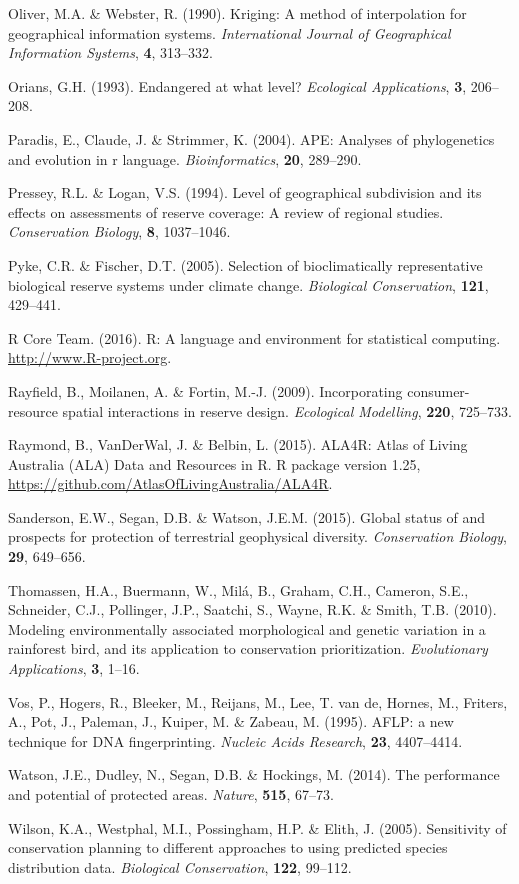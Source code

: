 \hypertarget{ref-r467}{}
Oliver, M.A. \& Webster, R. (1990). Kriging: A method of interpolation
for geographical information systems. \emph{International Journal of
Geographical Information Systems}, \textbf{4}, 313--332.

\hypertarget{ref-r489}{}
Orians, G.H. (1993). Endangered at what level? \emph{Ecological
Applications}, \textbf{3}, 206--208.

\hypertarget{ref-r464}{}
Paradis, E., Claude, J. \& Strimmer, K. (2004). APE: Analyses of
phylogenetics and evolution in r language. \emph{Bioinformatics},
\textbf{20}, 289--290.

\hypertarget{ref-r490}{}
Pressey, R.L. \& Logan, V.S. (1994). Level of geographical subdivision
and its effects on assessments of reserve coverage: A review of regional
studies. \emph{Conservation Biology}, \textbf{8}, 1037--1046.

\hypertarget{ref-r247}{}
Pyke, C.R. \& Fischer, D.T. (2005). Selection of bioclimatically
representative biological reserve systems under climate change.
\emph{Biological Conservation}, \textbf{121}, 429--441.

\hypertarget{ref-r192}{}
R Core Team. (2016). R: A language and environment for statistical
computing. \url{http://www.R-project.org}.

\hypertarget{ref-r471}{}
Rayfield, B., Moilanen, A. \& Fortin, M.-J. (2009). Incorporating
consumer-resource spatial interactions in reserve design.
\emph{Ecological Modelling}, \textbf{220}, 725--733.

\hypertarget{ref-r453}{}
Raymond, B., VanDerWal, J. \& Belbin, L. (2015). ALA4R: Atlas of Living
Australia (ALA) Data and Resources in R. R package version 1.25,
\url{https://github.com/AtlasOfLivingAustralia/ALA4R}.

\hypertarget{ref-r440}{}
Sanderson, E.W., Segan, D.B. \& Watson, J.E.M. (2015). Global status of
and prospects for protection of terrestrial geophysical diversity.
\emph{Conservation Biology}, \textbf{29}, 649--656.

\hypertarget{ref-r468}{}
Thomassen, H.A., Buermann, W., Milá, B., Graham, C.H., Cameron, S.E.,
Schneider, C.J., Pollinger, J.P., Saatchi, S., Wayne, R.K. \& Smith,
T.B. (2010). Modeling environmentally associated morphological and
genetic variation in a rainforest bird, and its application to
conservation prioritization. \emph{Evolutionary Applications},
\textbf{3}, 1--16.

\hypertarget{ref-r472}{}
Vos, P., Hogers, R., Bleeker, M., Reijans, M., Lee, T. van de, Hornes,
M., Friters, A., Pot, J., Paleman, J., Kuiper, M. \& Zabeau, M. (1995).
AFLP: a new technique for DNA fingerprinting. \emph{Nucleic Acids
Research}, \textbf{23}, 4407--4414.

\hypertarget{ref-r484}{}
Watson, J.E., Dudley, N., Segan, D.B. \& Hockings, M. (2014). The
performance and potential of protected areas. \emph{Nature},
\textbf{515}, 67--73.

\hypertarget{ref-r488}{}
Wilson, K.A., Westphal, M.I., Possingham, H.P. \& Elith, J. (2005).
Sensitivity of conservation planning to different approaches to using
predicted species distribution data. \emph{Biological Conservation},
\textbf{122}, 99--112.
